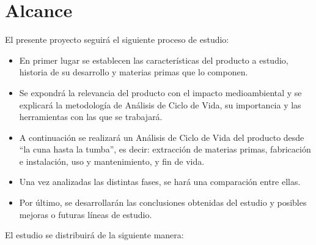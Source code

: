 \chapter{Alcance}\label{cap:alcance}

El presente proyecto seguirá el siguiente proceso de estudio:

\begin{itemize}
  \item En primer lugar se establecen las características del producto a estudio, historia de su desarrollo y materias primas que lo componen.
  \item Se expondrá la relevancia del producto con el impacto medioambiental y se explicará la metodología de Análisis de Ciclo de Vida, su importancia y las herramientas con las que se trabajará.
  \item A continuación se realizará un Análisis de Ciclo de Vida del producto desde ``la cuna hasta la tumba'', es decir: extracción de materias primas, fabricación e instalación, uso y mantenimiento, y fin de vida.
  \item Una vez analizadas las distintas fases, se hará una comparación entre ellas.
  \item Por último, se desarrollarán las conclusiones obtenidas del estudio y posibles mejoras o futuras líneas de estudio.
\end{itemize}

El estudio se distribuirá de la siguiente manera:

